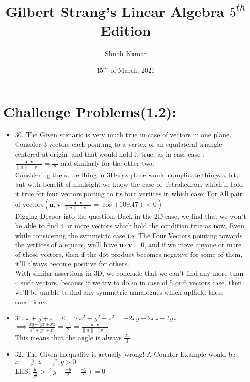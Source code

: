 \documentclass{article}
\title{Gilbert Strang's Linear Algebra $5^{th}$ Edition}
\author{Shubh Kumar}
\date{$15^{th}$ of March, 2021}
\begin{document}
\maketitle

\section{Challenge Problems(1.2):}
\begin{itemize}
  \item 30. The Given scenario is very much true in case of vectors in one plane. Consider 3 vectors each pointing to a vertex of an equilateral triangle centered at origin, and that would hold it true, as in case case : $\frac{\mathbf{u \cdot v}}{\|u\| \cdot \|v\|} = \frac{-1}{2}$ and similarly for the other two. \\
  Considering the same thing in 3D-xyz plane would complicate things a bit, but with benefit of hindsight we know the case of Tetrahedron, which'll hold it true for four vectors poiting to its four vertices in which case: For All pair of vectors$(\mathbf{u,v}: \frac{\mathbf{u \cdot v}}{\|u\| \cdot \|v\|} = \cos(109.47) < 0)$
  \\
  Digging Deeper into the question, Back in the 2D case, we find that we won't be able to find 4 or more vectors which hold the condition true as now, Even while considering the symmetric case i.e. The Four Vectors pointing towards the vertices of a square, we'll have $\mathbf{u \cdot v} = 0$, and if we move anyone or more of those vectors, then if the dot product becomes negative for some of them, it'll always become positive for others. \\
  With similar assertions in 3D, we conclude that we can't find any more than 4 such vectors, because if we try to do so in case of 5 or 6 vectors case, then we'll be unable to find any symmetric annalogues which uplhold these conditions.
  \item 31. $x+y+z=0 \implies x^2 + y^2 + z^2 = -2xy -2xz -2yz$\\
  $\implies \frac{xy+yz+xz}{x^2 + y^2 + z^2} = \frac{-1}{2} =  \frac{\mathbf{u \cdot v}}{\|u\| \cdot \|v\|}$ \\ This means that the angle is always $\frac{2\pi}{3}$

  \item 32. The Given Inequality is actually wrong! A Counter Example would be: \\
  $x = \frac{-y}{2}, z = \frac{-y}{2}, y > 0$ \\
  LHS: $\frac{y}{2^{\frac{2}{3}}} > (y-\frac{-y}{2}-\frac{-y}{2}) = 0$


\end{itemize}
\end{document}
